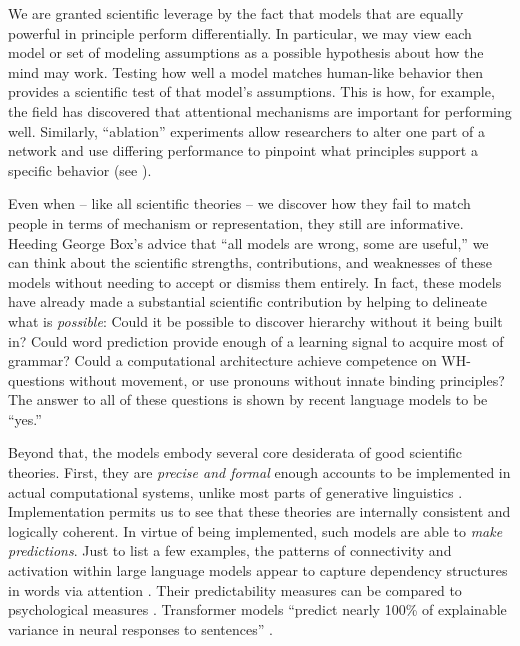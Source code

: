 \documentclass[output=paper,colorlinks,citecolor=brown
]{langscibook}
\begin{document}
We are granted scientific leverage by the fact that models that are equally powerful in principle perform differentially. In particular, we may view each model or set of modeling assumptions as a possible hypothesis about how the mind may work. Testing how well a model matches human-like behavior then provides a scientific test of that model's assumptions. This is how, for example, the field has discovered that attentional mechanisms are important for performing well.  Similarly, ``ablation'' experiments allow researchers to alter one part of a network and use differing performance to pinpoint what principles support a specific behavior (see \citealt{warstadt2022artificial}). 

Even when -- like all scientific theories -- we discover how they fail to match people in terms of mechanism or representation, they still are informative. Heeding George Box's advice that ``all models are wrong, some are useful,'' we can think about the scientific strengths, contributions, and weaknesses of these models without needing to accept or dismiss them entirely. In fact, these models have already made a substantial scientific contribution by helping to delineate what is \textit{possible}: Could it be possible to discover hierarchy without it being built in? Could word prediction provide enough of a learning signal to acquire most of grammar? Could a computational architecture achieve competence on WH-questions without movement, or use pronouns without innate binding principles? The answer to all of these questions is shown by recent language models to be ``yes.'' 

Beyond that, the models embody several core desiderata of good scientific theories. First, they are
\textit{precise and formal} enough accounts to be implemented in actual computational systems, unlike most parts of generative linguistics \citep{pullum1989formal}. Implementation permits us to see that these theories are internally consistent and logically coherent. In virtue of being implemented, such models are able to \textit{make predictions}. Just to list a few examples, the patterns of connectivity and activation within large language models appear to capture dependency structures in words via attention \citep{manning2020emergent}. Their predictability measures can be compared to psychological measures \citep{hoover2022plausibility,shain2022large}. Transformer models ``predict nearly 100\% of explainable variance in neural responses to sentences'' \citep{schrimpf2021neural}. 
\end{document}
